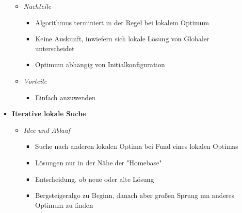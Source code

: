 \begin{itemize}
\begin{itemize}
                \item \textit{Nachteile}
                    \begin{itemize}
                        \item Algorithmus terminiert in der Regel bei lokalem Optimum
                        \item Keine Auskunft, inwiefern sich lokale Lösung von Globaler unterscheidet
                        \item Optimum abhängig von Initialkonfiguration
                    \end{itemize}
                \item \textit{Vorteile}
                    \begin{itemize}
                        \item Einfach anzuwenden
                    \end{itemize}
            \end{itemize}

        \item \textbf{Iterative lokale Suche}
            \begin{itemize}
                \item \textit{Idee und Ablauf}
                    \begin{itemize}
                        \item Suche nach anderen lokalen Optima bei Fund eines lokalen Optimas
                        \item Lösungen nur in der Nähe der \string"Homebase\string"
                        \item Entscheidung, ob neue oder alte Lösung
                        \item Bergsteigeralgo zu Beginn, danach aber großen Sprung um anderes Optimum zu finden
                    \end{itemize}


\end{itemize}
\end{itemize}
